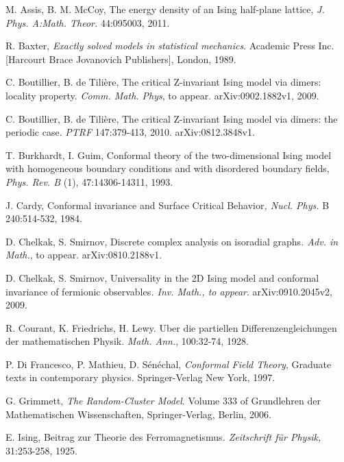 \documentclass[oneside,english]{amsart}
\numberwithin{equation}{section}
\numberwithin{figure}{section}
\theoremstyle{plain}
\theoremstyle{plain}
\theoremstyle{plain}
\theoremstyle{plain}
\theoremstyle{plain}
\theoremstyle{definition}
\theoremstyle{remark}
\begin{document}
\begin{thebibliography}{References}
M. Assis, B. M. McCoy, The energy density
of an Ising half-plane lattice, \emph{J. Phys. A:Math. Theor.} 44:095003,
2011.

R. Baxter, \emph{Exactly solved models in
statistical mechanics}. Academic Press Inc. {[}Harcourt Brace Jovanovich
Publishers{]}, London, 1989.

C. Boutillier, B. de Tilière,
The critical Z-invariant Ising model via dimers: locality property.
\emph{Comm. Math. Phys}, to appear. arXiv:0902.1882v1, 2009.

C. Boutillier, B. de Tilière,
The critical Z-invariant Ising model via dimers: the periodic case.
\emph{PTRF} 147:379-413, 2010. arXiv:0812.3848v1.

T. Burkhardt, I. Guim, Conformal theory
of the two-dimensional Ising model with homogeneous boundary conditions
and with disordered boundary fields,\emph{ Phys. Rev. B} (1), 47:14306-14311,
1993.

J. Cardy, Conformal invariance and Surface
Critical Behavior\emph{, Nucl. Phys.} B 240:514-532, 1984.

D. Chelkak, S. Smirnov, Discrete
complex analysis on isoradial graphs\emph{. Adv. in Math.}, to appear.
arXiv:0810.2188v1.

D. Chelkak, S. Smirnov, Universality
in the 2D Ising model and conformal invariance of fermionic observables\emph{.
Inv. Math., to appear}. arXiv:0910.2045v2, 2009.

R. Courant, K. Friedrichs,
H. Lewy. Uber die partiellen Differenzengleichungen der mathematischen
Physik.\emph{ Math. Ann.}, 100:32-74, 1928.

P. Di Francesco, P.
Mathieu, D. Sénéchal, \emph{Conformal Field Theory}, Graduate texts
in contemporary physics. Springer-Verlag New York, 1997.

G. Grimmett, \emph{The Random-Cluster Model}.
Volume 333 of Grundlehren der Mathematischen Wissenschaften, Springer-Verlag,
Berlin, 2006.

E. Ising,\emph{ }Beitrag zur Theorie des Ferromagnetismus\emph{.
Zeitschrift für Physik,} 31:253-258, 1925.


\end{thebibliography}
\end{document}
